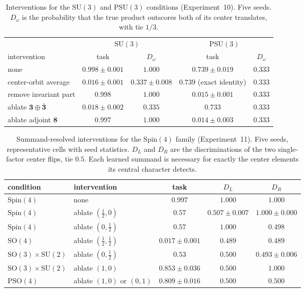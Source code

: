 \documentclass{article}
\newcommand{\SU}{\mathrm{SU}}
\newcommand{\SO}{\mathrm{SO}}
\newcommand{\PSU}{\mathrm{PSU}}
\newcommand{\Spin}{\mathrm{Spin}}
\newcommand{\PSO}{\mathrm{PSO}}
\begin{document}
\begin{table}[t]
\centering
\caption{Interventions for the $\SU(3)$ and $\PSU(3)$ conditions
(Experiment~10). Five seeds. $D_\omega$ is the probability that the
true product outscores both of its center translates, with tie
$1/3$.}
\label{tab:su3causal}
\scriptsize
\begin{tabular}{lcccc}
\toprule
 & \multicolumn{2}{c}{$\SU(3)$} & \multicolumn{2}{c}{$\PSU(3)$} \\
intervention & task & $D_\omega$ & task & $D_\omega$ \\
\midrule
none & $0.998 \pm 0.001$ & $1.000$ & $0.739 \pm 0.019$ & $0.333$ \\
center-orbit average & $0.016 \pm 0.001$ & $0.337 \pm 0.008$ & $0.739$ (exact identity) & $0.333$ \\
remove invariant part & $0.998$ & $1.000$ & $0.015 \pm 0.001$ & $0.333$ \\
ablate $\mathbf{3} \oplus \bar{\mathbf{3}}$ & $0.018 \pm 0.002$ & $0.335$ & $0.733$ & $0.333$ \\
ablate adjoint $\mathbf{8}$ & $0.997$ & $1.000$ & $0.014 \pm 0.003$ & $0.333$ \\
\bottomrule
\end{tabular}
\end{table}

\begin{table}[t]
\centering
\caption{Summand-resolved interventions for the $\Spin(4)$ family
(Experiment~11). Five seeds, representative cells with seed
statistics. $D_L$ and $D_R$ are the discriminations of the two
single-factor center flips, tie $0.5$. Each learned summand is
necessary for exactly the center elements its central character
detects.}
\label{tab:spin4causal}
\scriptsize
\begin{tabular}{llccc}
\toprule
condition & intervention & task & $D_L$ & $D_R$ \\
\midrule
$\Spin(4)$ & none & $0.997$ & $1.000$ & $1.000$ \\
$\Spin(4)$ & ablate $(\tfrac12, 0)$ & $0.57$ & $0.507 \pm 0.007$ & $1.000 \pm 0.000$ \\
$\Spin(4)$ & ablate $(0, \tfrac12)$ & $0.57$ & $1.000$ & $0.498$ \\
$\SO(4)$ & ablate $(\tfrac12, \tfrac12)$ & $0.017 \pm 0.001$ & $0.489$ & $0.489$ \\
$\SO(3){\times}\SU(2)$ & ablate $(0, \tfrac12)$ & $0.53$ & $0.500$ & $0.493 \pm 0.006$ \\
$\SO(3){\times}\SU(2)$ & ablate $(1, 0)$ & $0.853 \pm 0.036$ & $0.500$ & $1.000$ \\
$\PSO(4)$ & ablate $(1, 0)$ or $(0, 1)$ & $0.809 \pm 0.016$ & $0.500$ & $0.500$ \\
\bottomrule
\end{tabular}
\end{table}
\end{document}
